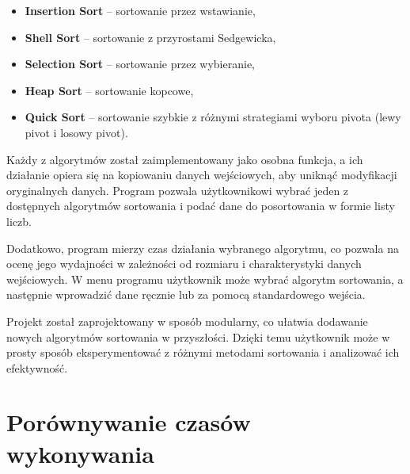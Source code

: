 \documentclass{article}
\begin{document}
	\begin{itemize}
		\item \textbf{Insertion Sort} – sortowanie przez wstawianie,
		\item \textbf{Shell Sort} – sortowanie z przyrostami Sedgewicka,
		\item \textbf{Selection Sort} – sortowanie przez wybieranie,
		\item \textbf{Heap Sort} – sortowanie kopcowe,
		\item \textbf{Quick Sort} – sortowanie szybkie z różnymi strategiami wyboru pivota (lewy pivot i losowy pivot).
	\end{itemize}
	
	Każdy z algorytmów został zaimplementowany jako osobna funkcja, a ich działanie opiera się na kopiowaniu danych wejściowych, aby uniknąć modyfikacji oryginalnych danych. Program pozwala użytkownikowi wybrać jeden z dostępnych algorytmów sortowania i podać dane do posortowania w formie listy liczb.
	
	Dodatkowo, program mierzy czas działania wybranego algorytmu, co pozwala na ocenę jego wydajności w zależności od rozmiaru i charakterystyki danych wejściowych. W menu programu użytkownik może wybrać algorytm sortowania, a następnie wprowadzić dane ręcznie lub za pomocą standardowego wejścia.
	
	Projekt został zaprojektowany w sposób modularny, co ułatwia dodawanie nowych algorytmów sortowania w przyszłości. Dzięki temu użytkownik może w prosty sposób eksperymentować z różnymi metodami sortowania i analizować ich efektywność.
\newpage
	
	\section{Porównywanie czasów wykonywania}
\end{document}
